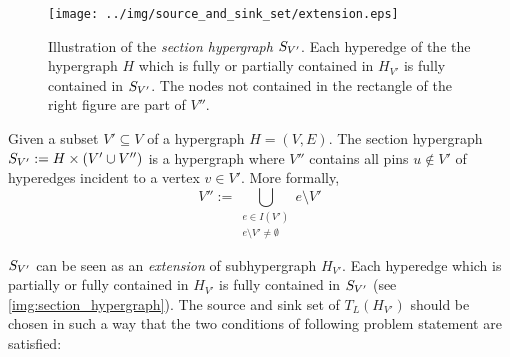\begin{figure}
\centering
\texttt{[image: ../img/source\_and\_sink\_set/extension.eps]}
\caption{Illustration of the \emph{section hypergraph} $S_{V'}$. Each hyperedge of the
         the hypergraph $H$ which is fully or partially contained in $H_{V'}$ is fully
         contained in $S_{V'}$. The nodes not contained in the rectangle of the right figure
         are part of $V''$.}
\label{img:section_hypergraph}
\end{figure}

\begin{definition}
\label{def:sub_extension}
Given a subset $V' \subseteq V$ of a hypergraph $H = (V,E)$.
The section hypergraph $S_{V'} := H \times (V' \cup V'')$ is a hypergraph
where $V''$ contains all pins $u \notin V'$ of hyperedges incident to a vertex 
$v \in V'$. More formally, 
\[V'' := \bigcup_{\substack{e \in I(V') \\ e \setminus V' \neq \emptyset}} e \setminus V'\]
\end{definition}

$S_{V'}$ can be seen as an \emph{extension} of subhypergraph $H_{V'}$. Each
hyperedge which is partially or fully contained in $H_{V'}$ is fully contained in $S_{V'}$
(see \autoref{img:section_hypergraph}). The source and sink set of $T_L(H_{V'})$ should be
chosen in such a way that the two conditions of following problem statement are satisfied:

